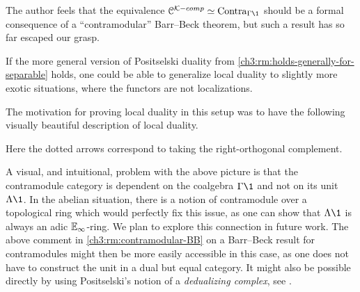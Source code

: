 \begin{remark}
    \label{ch3:rm:contramodular-BB}
    The author feels that the equivalence $\C^{\K-comp}\simeq \Contra_{\Gamma\1}$ should be a formal consequence of a ``contramodular'' Barr--Beck theorem, but such a result has so far escaped our grasp. 
\end{remark}

\begin{remark}
    If the more general version of Positselski duality from \cref{ch3:rm:holds-generally-for-separable} holds, one could be able to generalize local duality to slightly more exotic situations, where the functors are not localizations. 
\end{remark}

The motivation for proving local duality in this setup was to have the following visually beautiful description of local duality. 

\begin{center}
\end{center}

Here the dotted arrows correspond to taking the right-orthogonal complement. 

\begin{remark}
    \label{ch3:rm:contramodule-over-pro-ring}
    A visual, and intuitional, problem with the above picture is that the contramodule category is dependent on the coalgebra $\Gamma\1$ and not on its unit $\Lambda \1$. In the abelian situation, there is a notion of contramodule over a topological ring which would perfectly fix this issue, as one can show that $\Lambda \1$ is always an adic $\mathbb{E}_\infty$-ring. We plan to explore this connection in future work. The above comment in \cref{ch3:rm:contramodular-BB} on a Barr--Beck result for contramodules might then be more easily accessible in this case, as one does not have to construct the unit in a dual but equal category. It might also be possible directly by using Positselski's notion of a \emph{dedualizing complex}, see \cite{positselski_2016}. 
\end{remark}

